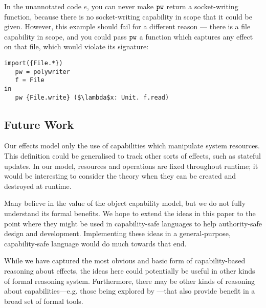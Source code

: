 In the unannotated code $e$, you can never make $\mathtt{pw}$ return a socket-writing function, because there is no socket-writing capability in scope that it could be given. However, this example should fail for a different reason --- there is a file capability in scope, and you could pass $\mathtt{pw}$ a function which captures any effect on that file, which would violate its signature:

\begin{lstlisting}
import({File.*}) 
   pw = polywriter
   f = File
in
   pw {File.write} ($\lambda$x: Unit. f.read)
\end{lstlisting}


\subsection{Future Work}

Our effects model only the use of capabilities which manipulate system resources. This definition could be generalised to track other sorts of effects, such as stateful updates. In our model, resources and operations are fixed throughout runtime; it would be interesting to consider the theory when they can be created and destroyed at runtime.

Many believe in the value of the object capability model, but we do not fully understand its formal benefits. We hope to extend the ideas in this paper to the point where they might be used in capability-safe languages to help authority-safe design and development. Implementing these ideas in a general-purpose, capability-safe language would do much towards that end.

While we have captured the most obvious and basic form of capability-based reasoning about effects, the ideas here could potentially be useful in other kinds of formal reasoning system.
Furthermore, there may be other kinds of reasoning about capabilities---e.g. those being explored by \citet{drossopoulou07}---that also provide benefit in a broad set of formal tools.

